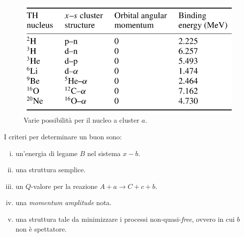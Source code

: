 \begin{figure}[h]
	\centering
	\includegraphics[scale=0.5]{Immagini/0419_tabella.png}
	\caption{Varie possibilità per il nucleo a cluster $a$.}
	\label{0419_tab}
\end{figure}
\newpage
\noindent I criteri per determinare un buon  sono:
\begin{enumerate}[(i)]
	\item un'energia di legame $B$  nel sistema $x-b$.
	\item una struttura semplice.
	\item un  $Q$-valore per la reazione $A+a\to C+c+b$.
	\item una \textit{momentum amplitude} nota.
	\item una struttura tale da minimizzare i processi non-quasi-\textit{free}, ovvero in cui $b$ non è spettatore.
\end{enumerate}